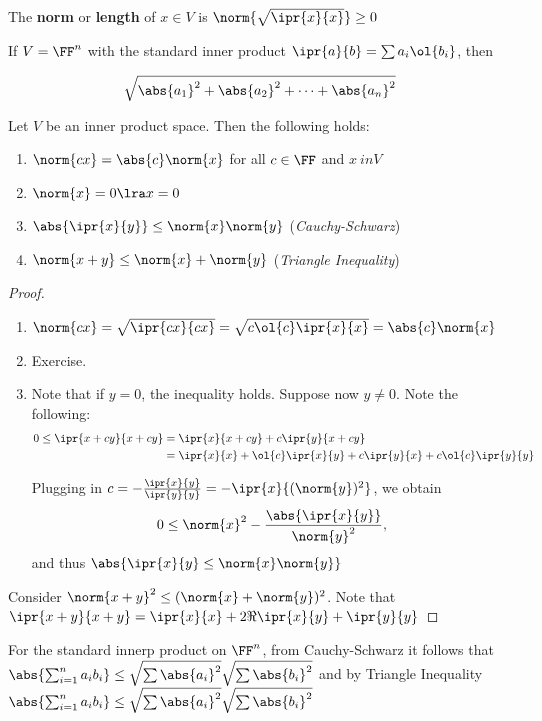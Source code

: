 \documentclass[11pt]{scrartcl}
\begin{document}
\begin{definition}
  \hfill

The \textbf{norm} or \textbf{length} of $x\in V$ is $\norm{\sqrt{\ipr{x}{x}}} \geq 0$
\end{definition}
\begin{example}

  If $V = \FF^n$ with the standard inner product
  $\ipr{a}{b} = \sum a_i\ol{b_{i}}$, then

  \begin{equation*}
    \sqrt{\abs{a_1}^2+\abs{a_2}^2+\cdots + \abs{a_n}^2}
  \end{equation*}
\end{example}

\begin{theorem}
  Let $V$ be an inner product space. Then the following holds:

  \begin{enumerate}[label=\alph*)]
  \item $\norm{cx} = \abs{c}\norm{x}$ for all $c \in \FF$ and $x\ in V$
  \item $\norm{x} = 0 \lra x = 0$
  \item $\abs{\ipr{x}{y}}\leq\norm{x}\norm{y}$ (\textit{Cauchy-Schwarz})
  \item $\norm{x+y}\leq \norm{x} + \norm{y}$ (\textit{Triangle Inequality})
  \end{enumerate}
\end{theorem}

\begin{proof}
  \begin{enumerate}[label=\alph*)]
  \item$\norm{cx} = \sqrt{\ipr{cx}{cx}} = \sqrt{c\ol{c}\ipr{x}{x}} = \abs{c}\norm{x}$
  \item Exercise.
  \item Note that if $y=0$, the inequality holds. Suppose now
    $y\neq 0$. Note the following:
    \begin{align}
      0\leq \ipr{x+cy}{x+cy} &= \ipr{x}{x+cy}+ c \ipr{y}{x+cy}\\
      &= \ipr{x}{x} + \ol{c}\ipr{x}{y}+c\ipr{y}{x}+ c\ol{c}\ipr{y}{y}
    \end{align}

    Plugging in
    $c = -\frac{\ipr{x}{y}}{\ipr{y}{y}} = -\ipr{x}{(\norm{y})^{2}}$,
    we obtain
    \begin{equation*}
      0\leq \norm{x}^{2} - \frac{\abs{\ipr{x}{y}}}{\norm{y}^{2}},
    \end{equation*}
    and thus $\abs{\ipr{x}{y}\leq \norm{x}\norm{y}}$
  \end{enumerate}
\item Consider $\norm{x+y}^2 \leq (\norm{x}+\norm{y})^2$. Note that
  $\ipr{x+y}{x+y} = \ipr{x}{x}+2\Re{\ipr{x}{y}}+\ipr{y}{y}$
\end{proof}

For the standard innerp product on $\FF^n$, from Cauchy-Schwarz it
follows that
$\abs{\sum_{i=1}^na_ib_i} \leq \sqrt{\sum \abs{a_i}^2}\sqrt{\sum
  \abs{b_i}^2}$ and by Triangle Inequality $\abs{\sum_{i=1}^na_ib_i} \leq \sqrt{\sum \abs{a_i}^2}\sqrt{\sum
  \abs{b_i}^2}$
\end{document}
